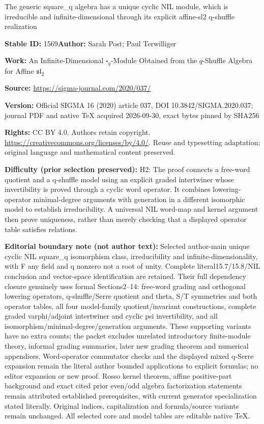 \documentclass[11pt]{article}
\numberwithin{equation}{section}
\numberwithin{equation}{section}
\begin{document}
\begin{center}\Large The generic square\_q algebra has a unique cyclic NIL module, which is irreducible and infinite-dimensional through its explicit affine-sl2 q-shuffle realization\end{center}
\noindent\textbf{Stable ID:} 1569\quad\textbf{Author:} Sarah Post; Paul Terwilliger\par
\noindent\textbf{Work:} An Infinite-Dimensional $\square_q$-Module Obtained from the $q$-Shuffle Algebra for Affine $\mathfrak{sl}_2$\par
\noindent\textbf{Source:} \url{https://sigma-journal.com/2020/037/}\par
\noindent\textbf{Version:} Official SIGMA 16 (2020) article 037, DOI 10.3842/SIGMA.2020.037; journal PDF and native TeX acquired 2026-09-30, exact bytes pinned by SHA256\par
\noindent\textbf{Rights:} CC BY 4.0. Authors retain copyright. \url{https://creativecommons.org/licenses/by/4.0/}. Reuse and typesetting adaptation; original language and mathematical content preserved.\par
\noindent\textbf{Difficulty (prior selection preserved):} {\CJKfont H2: The proof connects a free-word quotient and a q-shuffle model using an explicit graded intertwiner whose invertibility is proved through a cyclic word operator. It combines lowering-operator minimal-degree arguments with generation in a different isomorphic model to establish irreducibility. A universal NIL word-map and kernel argument then prove uniqueness, rather than merely checking that a displayed operator table satisfies relations.}\par
\medskip\noindent\textbf{Editorial boundary note (not author text):} Selected author-main unique cyclic NIL square\_q isomorphism class, irreducibility and infinite-dimensionality, with F any field and q nonzero not a root of unity. Complete literal15.7/15.8/NIL conclusion and vector-space identification are retained. Their full dependency closure genuinely uses formal Sections2–14: free-word grading and orthogonal lowering operators, q-shuffle/Serre quotient and theta, S/T symmetries and both operator tables, all four model-family quotient/invariant constructions, complete graded varphi/adjoint intertwiner and cyclic psi invertibility, and all isomorphism/minimal-degree/generation arguments. These supporting variants have no extra counts; the packet excludes unrelated introductory finite-module theory, informal grading summaries, later new grading theorem and numerical appendices. Word-operator commutator checks and the displayed mixed q-Serre expansion remain the literal author bounded applications to explicit formulas; no editor expansion or new proof. Rosso kernel theorem, affine positive-part background and exact cited prior even/odd algebra factorization statements remain attributed established prerequisites, with current generator specialization stated literally. Original indices, capitalization and formula/source variants remain unchanged. All selected core and model tables are editable native TeX.\par
\end{document}
